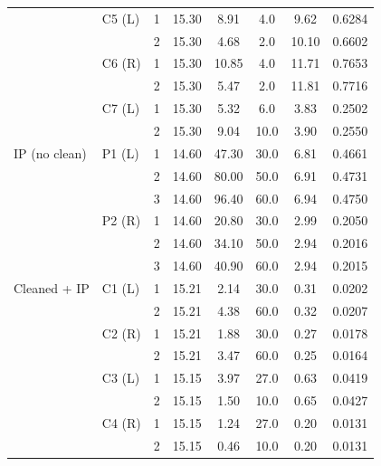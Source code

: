 {\begin{longtable}{llcccccc}
    \addlinespace[2pt]
     & C5 (L) & 1 & 15.30 & 8.91 & 4.0 & 9.62 & 0.6284 \\
     &  & 2 & 15.30 & 4.68 & 2.0 & 10.10 & 0.6602 \\
    \addlinespace[2pt]
     & C6 (R) & 1 & 15.30 & 10.85 & 4.0 & 11.71 & 0.7653 \\
     &  & 2 & 15.30 & 5.47 & 2.0 & 11.81 & 0.7716 \\
    \addlinespace[2pt]
     & C7 (L) & 1 & 15.30 & 5.32 & 6.0 & 3.83 & 0.2502 \\
     &  & 2 & 15.30 & 9.04 & 10.0 & 3.90 & 0.2550 \\
    \midrule
    IP (no clean) & P1 (L) & 1 & 14.60 & 47.30 & 30.0 & 6.81 & 0.4661 \\
     &  & 2 & 14.60 & 80.00 & 50.0 & 6.91 & 0.4731 \\
     &  & 3 & 14.60 & 96.40 & 60.0 & 6.94 & 0.4750 \\
    \addlinespace[2pt]
     & P2 (R) & 1 & 14.60 & 20.80 & 30.0 & 2.99 & 0.2050 \\
     &  & 2 & 14.60 & 34.10 & 50.0 & 2.94 & 0.2016 \\
     &  & 3 & 14.60 & 40.90 & 60.0 & 2.94 & 0.2015 \\
    \midrule
    Cleaned + IP & C1 (L) & 1 & 15.21 & 2.14 & 30.0 & 0.31 & 0.0202 \\
     &  & 2 & 15.21 & 4.38 & 60.0 & 0.32 & 0.0207 \\
    \addlinespace[2pt]
     & C2 (R) & 1 & 15.21 & 1.88 & 30.0 & 0.27 & 0.0178 \\
     &  & 2 & 15.21 & 3.47 & 60.0 & 0.25 & 0.0164 \\
    \addlinespace[2pt]
     & C3 (L) & 1 & 15.15 & 3.97 & 27.0 & 0.63 & 0.0419 \\
     &  & 2 & 15.15 & 1.50 & 10.0 & 0.65 & 0.0427 \\
    \addlinespace[2pt]
     & C4 (R) & 1 & 15.15 & 1.24 & 27.0 & 0.20 & 0.0131 \\
     &  & 2 & 15.15 & 0.46 & 10.0 & 0.20 & 0.0131 \\
  \bottomrule
\end{longtable}}

